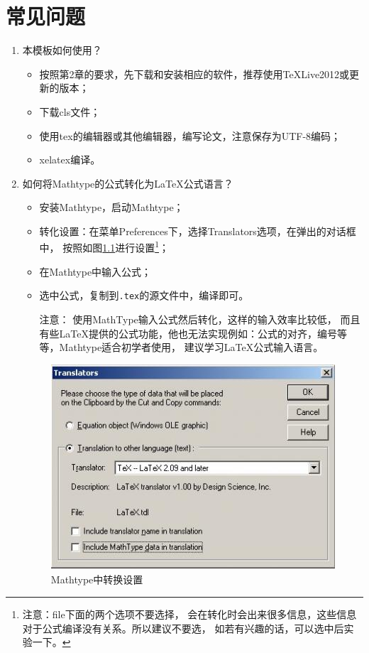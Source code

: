 \chapter{常见问题}
\label{chapter-faq}
\begin{enumerate}
\item 本模板如何使用？
\label{faq-howtouse}
\begin{itemize}
	\item 按照第2章的要求，先下载和安装相应的软件，推荐使用\TeX{}Live2012或更新的版本；
	\item 下载cls文件；
	\item 使用tex的编辑器或其他编辑器，编写论文，注意保存为UTF-8编码；
	\item xelatex编译。
\end{itemize}
\item 如何将Mathtype的公式转化为\LaTeX{}公式语言？
\label{faq-mathtype2latex}
\begin{itemize}
	\item 安装Mathtype，启动Mathtype；
	\item 转化设置：在菜单Preferences下，选择Translators选项，在弹出的对话框中，
按照如图\ref{fig-fqa-mathtype1}进行设置\footnote{{\heiti 注意}：file下面的两个选项不要选择，
会在转化时会出来很多信息，这些信息对于公式编译没有关系。所以建议不要选，
如若有兴趣的话，可以选中后实验一下。}；
\item 在Mathtype中输入公式；
\item 选中公式，复制到\texttt{.tex}的源文件中，编译即可。
\item[{\heiti 注意：}] 使用MathType输入公式然后转化，这样的输入效率比较低，
而且有些LaTeX提供的公式功能，他也无法实现例如：公式的对齐，编号等等，Mathtype适合初学者使用，
建议学习\LaTeX{}公式输入语言。
\end{itemize}
\begin{figure}
\begin{center}
\includegraphics[width=.7\textwidth]{figure/faq-mathtype1.jpg}
\end{center}
\caption{Mathtype中转换设置}\label{fig-fqa-mathtype1}
\end{figure}
\end{enumerate}